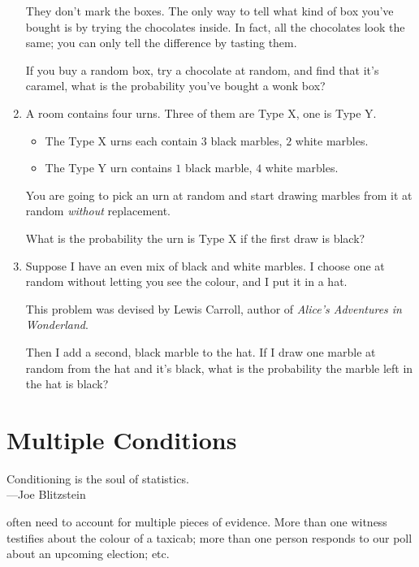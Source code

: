 \documentclass[justified]{tufte-book}
\providecommand{\tightlist}{%
  \setlength{\itemsep}{0pt}\setlength{\parskip}{0pt}}
\newenvironment{epigraph}%
{
\begin{flushright}    
\begin{minipage}{20em}
\begin{flushright}
\itshape
}%
{
\end{flushright}
\end{minipage}
\end{flushright}
}
\theoremstyle{definition}
\theoremstyle{definition}
\theoremstyle{definition}
\theoremstyle{remark}
\begin{document}
\begin{enumerate}
  They don't mark the boxes. The only way to tell what kind of box you've bought is by trying the chocolates inside. In fact, all the chocolates look the same; you can only tell the difference by tasting them.

  If you buy a random box, try a chocolate at random, and find that it's caramel, what is the probability you've bought a wonk box?
\item
  A room contains four urns. Three of them are Type X, one is Type Y.

  \begin{itemize}
  \tightlist
  \item
    The Type X urns each contain \(3\) black marbles, \(2\) white marbles.
  \item
    The Type Y urn contains \(1\) black marble, \(4\) white marbles.
  \end{itemize}

  You are going to pick an urn at random and start drawing marbles from it at random \emph{without} replacement.

  What is the probability the urn is Type X if the first draw is black?
\item
  Suppose I have an even mix of black and white marbles. I choose one at random without letting you see the colour, and I put it in a hat.

  \begin{marginfigure}
  This problem was devised by Lewis Carroll, author of \emph{Alice's
  Adventures in Wonderland}.
  \end{marginfigure}

  Then I add a second, black marble to the hat. If I draw one marble at random from the hat and it's black, what is the probability the marble left in the hat is black?
\end{enumerate}

\hypertarget{multiple-conditions}{%
\chapter{Multiple Conditions}\label{multiple-conditions}}

\begin{epigraph}
Conditioning is the soul of statistics.\\
---Joe Blitzstein
\end{epigraph}

 often need to account for multiple pieces of evidence. More than one witness testifies about the colour of a taxicab; more than one person responds to our poll about an upcoming election; etc.
\end{document}
